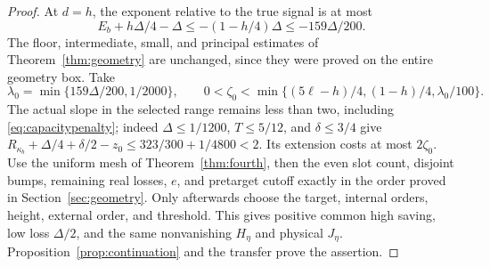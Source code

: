 \begin{proof}
At $d=h$, the exponent relative to the true signal is at most
\begin{equation}\label{eq:actualgap}
 E_b+h\Delta/4-\Delta\le-(1-h/4)\Delta
                         \le-159\Delta/200.
\end{equation}
The floor, intermediate, small, and principal estimates of Theorem~\ref{thm:geometry} are unchanged, since they were proved on the entire geometry box. Take
\[
 \lambda_0=\min\{159\Delta/200,1/2000\},\qquad
 0<\zeta_0<\min\{(5\ell-h)/4,(1-h)/4,\lambda_0/100\}.
\]
The actual slope in the selected range remains less than two, including \eqref{eq:capacitypenalty}; indeed $\Delta\le1/1200$, $T\le5/12$, and $\delta\le3/4$ give $R_{\kappa_b}+\Delta/4+\delta/2-z_0\le323/300+1/4800<2$. Its extension costs at most $2\zeta_0$. Use the uniform mesh of Theorem~\ref{thm:fourth}, then the even slot count, disjoint bumps, remaining real losses, $e$, and pretarget cutoff exactly in the order proved in Section~\ref{sec:geometry}. Only afterwards choose the target, internal orders, height, external order, and threshold. This gives positive common high saving, low loss $\Delta/2$, and the same nonvanishing $H_\eta$ and physical $J_\eta$. Proposition~\ref{prop:continuation} and the transfer prove the assertion.
\end{proof}

